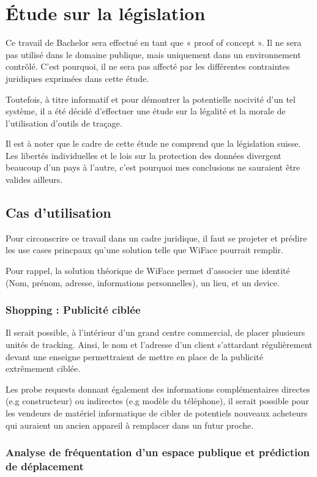\chapter{Étude sur la législation}
\label{ch:etudelegislation}

Ce travail de Bachelor sera effectué en tant que « proof of concept ». Il ne sera pas utilisé dans le domaine publique,
mais uniquement dans un environnement contrôlé. C’est pourquoi, il ne sera pas affecté par les différentes
contraintes juridiques exprimées dans cette étude.

Toutefois, à titre informatif et pour démontrer la potentielle nocivité d’un tel système, il a été décidé d’effectuer
une étude sur la légalité et la morale de l’utilisation d’outils de traçage.

Il est à noter que le cadre de cette étude ne comprend que la législation suisse. Les libertés individuelles et le lois sur la protection des données divergent beaucoup
d'un pays à l'autre, c'est pourquoi mes conclusions ne sauraient être valides ailleurs. 

\section{Cas d’utilisation}
Pour circonscrire ce travail dans un cadre juridique, il faut se projeter et prédire les use cases princpaux qu’une
solution telle que WiFace pourrait remplir.

Pour rappel, la solution théorique de WiFace permet d’associer une identité (Nom, prénom, adresse, informations
personnelles), un lieu, et un device.

\subsection{Shopping : Publicité ciblée}

Il serait possible, à l’intérieur d’un grand centre commercial, de placer plusieurs unités de tracking. Ainsi, le nom et
l’adresse d’un client s’attardant régulièrement devant une enseigne permettraient de mettre en place de la publicité extrêmement ciblée.

Les probe requests donnant également des informations complémentaires directes (e.g constructeur) ou indirectes
(e.g modèle du téléphone), il serait possible pour les vendeurs de matériel informatique de cibler de potentiels nouveaux
acheteurs qui auraient un ancien appareil à remplacer dans un futur proche.

\subsection{Analyse de fréquentation d’un espace publique et prédiction de déplacement}

